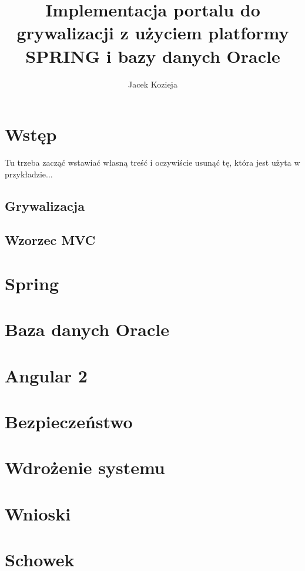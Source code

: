 \documentclass[a4paper,12pt,twoside,openany]{report}
\title{Implementacja portalu do grywalizacji z użyciem platformy SPRING i bazy danych Oracle}
\author{Jacek Kozieja}
\begin{document}
\maketitle

\chapter{Wstęp}
Tu trzeba zacząć wstawiać własną treść i oczywiście usunąć tę, która jest użyta w przykładzie...
\section{Grywalizacja}

\section{Wzorzec MVC}

\chapter{Spring}

\chapter{Baza danych Oracle}

\chapter{Angular 2}

\chapter{Bezpieczeństwo}

\chapter{Wdrożenie systemu}

\chapter{Wnioski}


\chapter{Schowek}
\label{Schowek}
\end{document}
